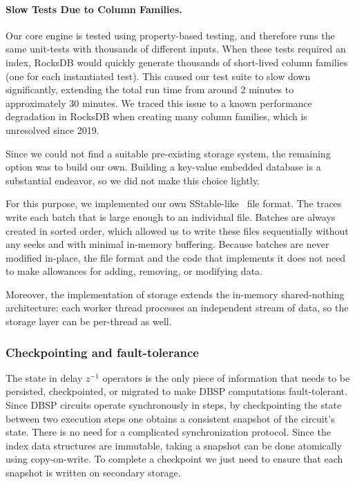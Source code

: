 \documentclass[twocolumn
]{svjour3}
\numberwithin{equation}{section}
\newcommand{\dbsp}{DBSP\xspace}
\newcommand{\zm}{\ensuremath{z^{-1}}} %
\begin{document}
\paragraph{Slow Tests Due to Column Families.} Our core engine is tested
using property-based testing, and therefore runs the same unit-tests
with thousands of different inputs.  When these tests required an
index, RocksDB would quickly generate thousands of short-lived column
families (one for each instantiated test).  This caused our test suite
to slow down significantly, extending the total run time from around 2
minutes to approximately 30 minutes.  We traced this issue to a known
performance degradation in RocksDB when creating many column families,
which is unresolved since 2019.

Since we could not find a suitable pre-existing storage system, the
remaining option was to build our own. Building a key-value embedded
database is a substantial endeavor, so we did not make this choice
lightly.

For this purpose, we implemented our own
SStable-like~\cite{chang-tcs08} file format. The traces write each
batch that is large enough to an individual file.  Batches are always
created in sorted order, which allowed us to write these files
sequentially without any seeks and with minimal in-memory buffering.
Because batches are never modified in-place, the file format and the
code that implements it does not need to make allowances for adding,
removing, or modifying data.

Moreover, the implementation of storage extends the in-memory
shared-nothing architecture: each worker thread processes an
independent stream of data, so the storage layer can be per-thread as
well.

\subsubsection{Checkpointing and fault-tolerance}

The state in delay $\zm$ operators is the only piece of information
that needs to be persisted, checkpointed, or migrated to make \dbsp
computations fault-tolerant.  Since \dbsp circuits operate
synchronously in steps, by checkpointing the state between two
execution steps one obtains a consistent snapshot of the circuit's
state.  There is no need for a complicated synchronization protocol.
Since the index data structures are immutable, taking a snapshot can
be done atomically using copy-on-write.  To complete a checkpoint we
just need to ensure that each snapshot is written on secondary
storage.
\end{document}
